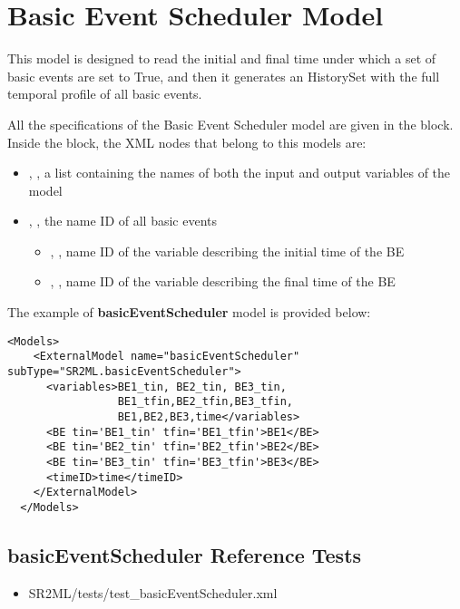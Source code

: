 \section{Basic Event Scheduler Model}
\label{sec:basicEventScheduler}

This model is designed to read the initial and final time under which a set of basic events
are set to True, and then it generates an HistorySet with the full temporal profile of all
basic events.


All the specifications of the Basic Event Scheduler model are given in the  block.
Inside the  block, the XML
nodes that belong to this models are:
\begin{itemize}
  \item  {}, , a list containing the names of both the input and output variables of the model
  \item  {}, , the name ID of all basic events
	  \begin{itemize}
	    \item {}, , name ID of the variable describing the initial time of the BE
	    \item {}, , name ID of the variable describing the final time of the BE
	  \end{itemize}
\end{itemize}

The example of \textbf{basicEventScheduler} model is provided below:
\begin{lstlisting}[style=XML]
  <Models>
    <ExternalModel name="basicEventScheduler" subType="SR2ML.basicEventScheduler">
      <variables>BE1_tin, BE2_tin, BE3_tin,
                 BE1_tfin,BE2_tfin,BE3_tfin,
                 BE1,BE2,BE3,time</variables>
      <BE tin='BE1_tin' tfin='BE1_tfin'>BE1</BE>
      <BE tin='BE2_tin' tfin='BE2_tfin'>BE2</BE>
      <BE tin='BE3_tin' tfin='BE3_tfin'>BE3</BE>
      <timeID>time</timeID>
    </ExternalModel>
  </Models>
\end{lstlisting}

\subsection{basicEventScheduler Reference Tests}
\begin{itemize}
	\item SR2ML/tests/test\_basicEventScheduler.xml
\end{itemize}


